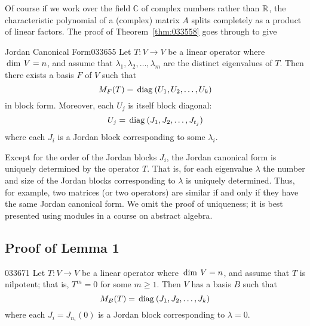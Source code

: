 Of course if we work over the field $\mathbb{C}$ of complex numbers rather than $\mathbb{R}$, the characteristic polynomial of a (complex) matrix $A$ splits completely as a product of linear factors. The proof of Theorem~\ref{thm:033558} goes through to give


\begin{theorem}{Jordan Canonical Form\footnotemark}{033655}
Let $T : V \to V$ be a linear operator where $\thinspace\operatorname{dim \medspace}V = n$, and assume that $\lambda_{1}, \lambda_{2}, \dots, \lambda_{m}$ are the distinct eigenvalues of $T$. Then there exists a basis $F$ of $V$ such that
\begin{equation*}
M_F(T) = \thinspace\operatorname{diag\medspace}(U_1, U_2, \dots, U_k)
\end{equation*}
in block form. Moreover, each $U_{j}$ is itself block diagonal:
\begin{equation*}
U_j = \thinspace\operatorname{diag\medspace}(J_1, J_2, \dots, J_{t_j})
\end{equation*}
where each $J_{i}$ is a Jordan block corresponding to some $\lambda_{i}$.
\end{theorem}

\noindent Except for the order of the Jordan blocks $J_{i}$, the Jordan canonical form is uniquely determined by the operator $T$. That is, for each eigenvalue $\lambda$ the number and size of the Jordan blocks corresponding to $\lambda$ is uniquely determined. Thus, for example, two matrices (or two operators) are similar if and only if they have the same Jordan canonical form. We omit the proof of uniqueness; it is best presented using modules in a course on abstract algebra.


\subsection*{Proof of Lemma 1}

\setcounter{LemmaCounter}{0}
\begin{lemma}{}{033671}
Let $T : V \to V$ be a linear operator where $\thinspace\operatorname{dim \medspace}V = n$, and assume that $T$ is nilpotent; that is, $T^{m} = 0$ for some $m \geq 1$. Then $V$ has a basis $B$ such that
\begin{equation*}
M_B(T) = \thinspace\operatorname{diag\medspace}(J_1, J_2, \dots, J_k)
\end{equation*}
where each $J_{i} = J_{n_{i}}(0)$ is a Jordan block corresponding to $\lambda = 0$.
\end{lemma}


